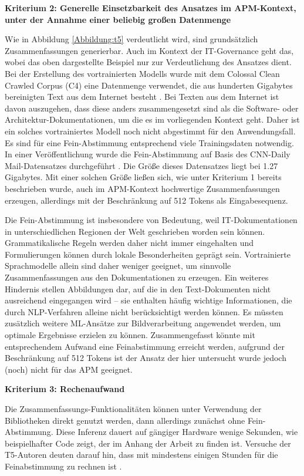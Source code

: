{\bf Kriterium 2: Generelle Einsetzbarkeit des Ansatzes im APM-Kontext, unter der Annahme einer beliebig großen Datenmenge}

Wie in Abbildung \ref{Abbildung:t5} verdeutlicht wird, sind grundsätzlich Zusammenfassungen generierbar. Auch im Kontext der IT-Governance geht das, wobei das oben dargestellte Beispiel nur zur Verdeutlichung des Ansatzes dient. Bei der Erstellung des vortrainierten Modells wurde mit dem Colossal Clean Crawled Corpus (C4) eine Datenmenge verwendet, die aus hunderten Gigabytes bereinigten Text aus dem Internet besteht \cite[S. 5-7]{Raffel}. Bei Texten aus dem Internet ist davon auszugehen, dass diese anders zusammengesetzt sind als die Software- oder Architektur-Dokumentationen, um die es im vorliegenden Kontext geht. Daher ist ein solches vortrainiertes Modell noch nicht abgestimmt für den Anwendungsfall. Es sind für eine Fein-Abstimmung entsprechend viele Trainingsdaten notwendig. In einer Veröffentlichung wurde die Fein-Abstimmung auf Basis des CNN-Daily Mail-Datensatzes durchgeführt \cite[S. 37]{Raffel}. Die Größe dieses Datensatzes liegt bei 1.27 Gigabytes. Mit einer solchen Größe ließen sich, wie unter Kriterium 1 bereits beschrieben wurde, auch im APM-Kontext hochwertige Zusammenfassungen erzeugen, allerdings mit der Beschränkung auf 512 Tokens als Eingabesequenz.

Die Fein-Abstimmung ist insbesondere von Bedeutung, weil IT-Dokumentationen in unterschiedlichen Regionen der Welt geschrieben worden sein können. Grammatikalische Regeln werden daher nicht immer eingehalten und Formulierungen können durch lokale Besonderheiten geprägt sein. Vortrainierte Sprachmodelle allein sind daher weniger geeignet, um sinnvolle Zusammenfassungen aus den Dokumentationen zu erzeugen. Ein weiteres Hindernis stellen Abbildungen dar, auf die in den Text-Dokumenten nicht ausreichend eingegangen wird – sie enthalten häufig wichtige Informationen, die durch NLP-Verfahren alleine nicht berücksichtigt werden können. Es müssten zusätzlich weitere ML-Ansätze zur Bildverarbeitung angewendet werden, um optimale Ergebnisse erzielen zu können. Zusammengefasst könnte mit entsprechendem Aufwand eine Feinabstimmung erreicht werden, aufgrund der Beschränkung auf 512 Tokens ist der Ansatz der hier untersucht wurde jedoch (noch) nicht für das APM geeignet.

{\bf Kriterium 3: Rechenaufwand}

Die Zusammenfassungs-Funktionalitäten können unter Verwendung der Bibliotheken direkt genutzt werden, dann allerdings zunächst ohne Fein-Abstimmung. Diese Inferenz dauert auf gängiger Hardware wenige Sekunden, wie beispielhafter Code zeigt, der im Anhang der Arbeit zu finden ist. Versuche der T5-Autoren deuten darauf hin, dass mit mindestens einigen Stunden für die Feinabstimmung zu rechnen ist \cite{Raffel}.

